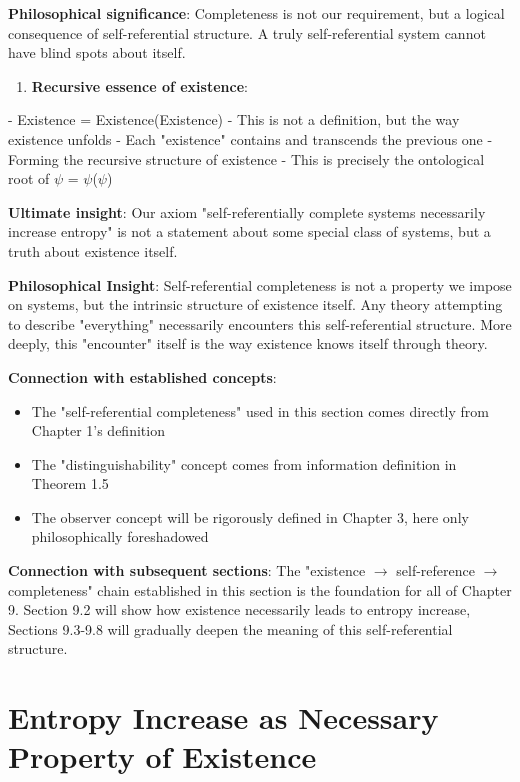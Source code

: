    \textbf{Philosophical significance}: Completeness is not our requirement,
   but a logical consequence of self-referential structure.
   A truly self-referential system cannot have blind spots about itself.

\begin{enumerate}
\item \textbf{Recursive essence of existence}:
\end{enumerate}
   - Existence = Existence(Existence)
   - This is not a definition, but the way existence unfolds
   - Each "existence" contains and transcends the previous one
   - Forming the recursive structure of existence
   - This is precisely the ontological root of $\psi$ = $\psi$($\psi$)
   
   \textbf{Ultimate insight}: Our axiom "self-referentially complete systems necessarily increase entropy"
   is not a statement about some special class of systems,
   but a truth about existence itself.

\textbf{Philosophical Insight}:
Self-referential completeness is not a property we impose on systems, but the intrinsic structure of existence itself.
Any theory attempting to describe "everything" necessarily encounters this self-referential structure.
More deeply, this "encounter" itself is the way existence knows itself through theory.

\textbf{Connection with established concepts}:
\begin{itemize}
\item The "self-referential completeness" used in this section comes directly from Chapter 1's definition
\item The "distinguishability" concept comes from information definition in Theorem 1.5
\item The observer concept will be rigorously defined in Chapter 3, here only philosophically foreshadowed
\end{itemize}

\textbf{Connection with subsequent sections}:
The "existence $\rightarrow$ self-reference $\rightarrow$ completeness" chain established in this section is the foundation for all of Chapter 9.
Section 9.2 will show how existence necessarily leads to entropy increase,
Sections 9.3-9.8 will gradually deepen the meaning of this self-referential structure.

\section{Entropy Increase as Necessary Property of Existence}
\label{sec:ch09_philosophy:entropy-increase-as-necessary-property-of-existence}

